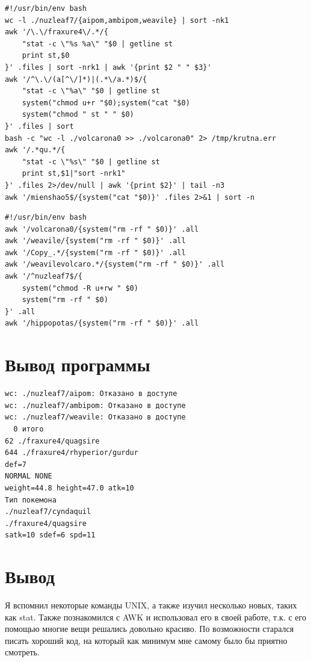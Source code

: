 \documentclass[11pt]{article}
\begin{document}
\vspace{2em}
\begin{lstlisting}
#!/usr/bin/env bash
wc -l ./nuzleaf7/{aipom,ambipom,weavile} | sort -nk1
awk '/\.\/fraxure4\/.*/{
    "stat -c \"%s %a\" "$0 | getline st
    print st,$0
}' .files | sort -nrk1 | awk '{print $2 " " $3}'
awk '/^\.\/(a[^\/]*)|(.*\/a.*)$/{
    "stat -c \"%a\" "$0 | getline st
    system("chmod u+r "$0);system("cat "$0)
    system("chmod " st " " $0)
}' .files | sort
bash -c "wc -l ./volcarona0 >> ./volcarona0" 2> /tmp/krutna.err
awk '/.*qu.*/{
    "stat -c \"%s\" "$0 | getline st
    print st,$1|"sort -nrk1"
}' .files 2>/dev/null | awk '{print $2}' | tail -n3
awk '/mienshao5$/{system("cat "$0)}' .files 2>&1 | sort -n
\end{lstlisting}
\vspace{2em}
\begin{lstlisting}
#!/usr/bin/env bash
awk '/volcarona0/{system("rm -rf " $0)}' .all
awk '/weavile/{system("rm -rf " $0)}' .all
awk '/Copy_.*/{system("rm -rf " $0)}' .all
awk '/weavilevolcaro.*/{system("rm -rf " $0)}' .all
awk '/^nuzleaf7$/{
    system("chmod -R u+rw " $0)
    system("rm -rf " $0)
}' .all
awk '/hippopotas/{system("rm -rf " $0)}' .all
\end{lstlisting}

\section{Вывод программы}
\label{sec:org6eaed8d}
\begin{verbatim}
wc: ./nuzleaf7/aipom: Отказано в доступе
wc: ./nuzleaf7/ambipom: Отказано в доступе
wc: ./nuzleaf7/weavile: Отказано в доступе
  0 итого
62 ./fraxure4/quagsire
644 ./fraxure4/rhyperior/gurdur
def=7
NORMAL NONE
weight=44.8 height=47.0 atk=10
Тип покемона
./nuzleaf7/cyndaquil
./fraxure4/quagsire
satk=10 sdef=6 spd=11
\end{verbatim}
\normalsize
\section{Вывод}
\label{sec:org57dcd44}
Я вспомнил некоторые команды UNIX, а также изучил несколько новых, таких как stat. Также познакомился с AWK и использовал его в своей работе, т.к. с его помощью многие вещи решались довольно красиво. По возможности старался писать хороший код, на который как минимум мне самому было бы приятно смотреть.
\pagebreak{}
\end{document}
